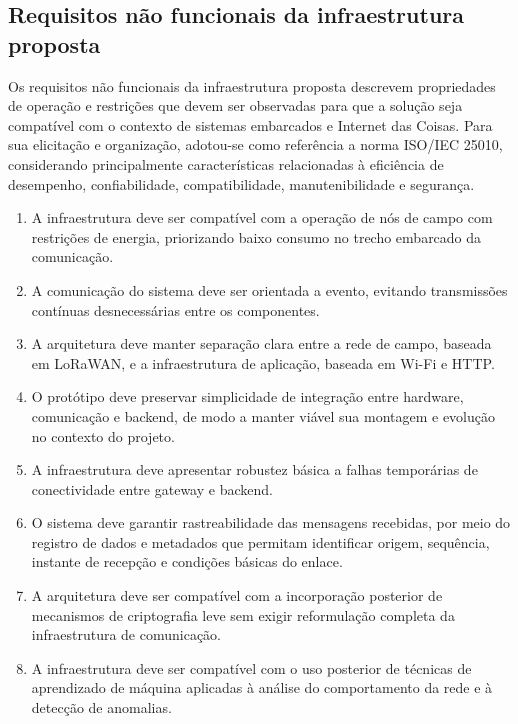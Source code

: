 
\subsection{Requisitos não funcionais da infraestrutura proposta}

Os requisitos não funcionais da infraestrutura proposta descrevem propriedades de operação e restrições que devem ser observadas para que a solução seja compatível com o contexto de sistemas embarcados e Internet das Coisas. Para sua elicitação e organização, adotou-se como referência a norma ISO/IEC 25010, considerando principalmente características relacionadas à eficiência de desempenho, confiabilidade, compatibilidade, manutenibilidade e segurança.

\begin{enumerate}
    \item[RNF1.] A infraestrutura deve ser compatível com a operação de nós de campo com restrições de energia, priorizando baixo consumo no trecho embarcado da comunicação.

    \item[RNF2.] A comunicação do sistema deve ser orientada a evento, evitando transmissões contínuas desnecessárias entre os componentes.

    \item[RNF3.] A arquitetura deve manter separação clara entre a rede de campo, baseada em LoRaWAN, e a infraestrutura de aplicação, baseada em Wi-Fi e HTTP.

    \item[RNF4.] O protótipo deve preservar simplicidade de integração entre hardware, comunicação e backend, de modo a manter viável sua montagem e evolução no contexto do projeto.

    \item[RNF5.] A infraestrutura deve apresentar robustez básica a falhas temporárias de conectividade entre gateway e backend.

    \item[RNF6.] O sistema deve garantir rastreabilidade das mensagens recebidas, por meio do registro de dados e metadados que permitam identificar origem, sequência, instante de recepção e condições básicas do enlace.

    \item[RNF7.] A arquitetura deve ser compatível com a incorporação posterior de mecanismos de criptografia leve sem exigir reformulação completa da infraestrutura de comunicação.

    \item[RNF8.] A infraestrutura deve ser compatível com o uso posterior de técnicas de aprendizado de máquina aplicadas à análise do comportamento da rede e à detecção de anomalias.
\end{enumerate}


